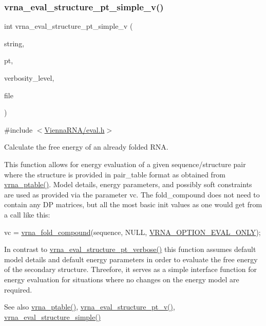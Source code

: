 \subsubsection{\texorpdfstring{vrna\+\_\+eval\+\_\+structure\+\_\+pt\+\_\+simple\+\_\+v()}{vrna\_eval\_structure\_pt\_simple\_v()}}
{\footnotesize\ttfamily int vrna\+\_\+eval\+\_\+structure\+\_\+pt\+\_\+simple\+\_\+v (\begin{DoxyParamCaption}\item[{const char $\ast$}]{string,  }\item[{const short $\ast$}]{pt,  }\item[{int}]{verbosity\+\_\+level,  }\item[{F\+I\+LE $\ast$}]{file }\end{DoxyParamCaption})}



{\ttfamily \#include $<$\mbox{\hyperlink{eval_8h}{Vienna\+R\+N\+A/eval.\+h}}$>$}



Calculate the free energy of an already folded R\+NA. 

This function allows for energy evaluation of a given sequence/structure pair where the structure is provided in pair\+\_\+table format as obtained from \mbox{\hyperlink{group__struct__utils_gae829fb8bb7f694c12a9c0bbc34c77c60}{vrna\+\_\+ptable()}}. Model details, energy parameters, and possibly soft constraints are used as provided via the parameter \textquotesingle{}vc\textquotesingle{}. The fold\+\_\+compound does not need to contain any DP matrices, but all the most basic init values as one would get from a call like this\+: 
\begin{DoxyCode}
vc = \mbox{\hyperlink{group__fold__compound_ga6601d994ba32b11511b36f68b08403be}{vrna\_fold\_compound}}(sequence, NULL, \mbox{\hyperlink{group__fold__compound_ga61469c423131552c8483229f8b6c7e0e}{VRNA\_OPTION\_EVAL\_ONLY}});
\end{DoxyCode}
 In contrast to \mbox{\hyperlink{group__eval_ga8a517cfeeae8c376ae7b1e0c401d38b4}{vrna\+\_\+eval\+\_\+structure\+\_\+pt\+\_\+verbose()}} this function assumes default model details and default energy parameters in order to evaluate the free energy of the secondary structure. Threefore, it serves as a simple interface function for energy evaluation for situations where no changes on the energy model are required.

\begin{DoxySeeAlso}{See also}
\mbox{\hyperlink{group__struct__utils_gae829fb8bb7f694c12a9c0bbc34c77c60}{vrna\+\_\+ptable()}}, \mbox{\hyperlink{group__eval_ga2c6533ba0afe4c88d335d8f1e0e2a48e}{vrna\+\_\+eval\+\_\+structure\+\_\+pt\+\_\+v()}}, \mbox{\hyperlink{group__eval_ga7e5273464b775d4130245681312c1369}{vrna\+\_\+eval\+\_\+structure\+\_\+simple()}}
\end{DoxySeeAlso}

